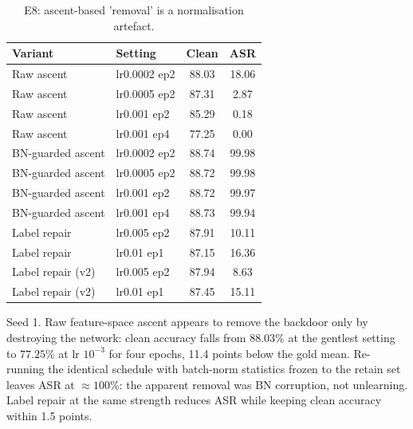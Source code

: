 \begin{table}[t]
\centering
\caption{E8: ascent-based 'removal' is a normalisation artefact.}
\label{tab:e8}
\footnotesize
\begin{tabular}{llcc}
\toprule
\textbf{Variant} & \textbf{Setting} & \textbf{Clean} & \textbf{ASR} \\
\midrule
Raw ascent & lr0.0002 ep2 & 88.03 & 18.06 \\
Raw ascent & lr0.0005 ep2 & 87.31 & 2.87 \\
Raw ascent & lr0.001 ep2 & 85.29 & 0.18 \\
Raw ascent & lr0.001 ep4 & 77.25 & 0.00 \\
BN-guarded ascent & lr0.0002 ep2 & 88.74 & 99.98 \\
BN-guarded ascent & lr0.0005 ep2 & 88.72 & 99.98 \\
BN-guarded ascent & lr0.001 ep2 & 88.72 & 99.97 \\
BN-guarded ascent & lr0.001 ep4 & 88.73 & 99.94 \\
Label repair & lr0.005 ep2 & 87.91 & 10.11 \\
Label repair & lr0.01 ep1 & 87.15 & 16.36 \\
Label repair (v2) & lr0.005 ep2 & 87.94 & 8.63 \\
Label repair (v2) & lr0.01 ep1 & 87.45 & 15.11 \\
\bottomrule
\end{tabular}
\par\vspace{1pt}\footnotesize\raggedright Seed 1. Raw feature-space ascent appears to remove the backdoor only by destroying the network: clean accuracy falls from $88.03\%$ at the gentlest setting to $77.25\%$ at lr $10^{-3}$ for four epochs, 11.4 points below the gold mean. Re-running the identical schedule with batch-norm statistics frozen to the retain set leaves ASR at $\approx100\%$: the apparent removal was BN corruption, not unlearning. Label repair at the same strength reduces ASR while keeping clean accuracy within 1.5 points.
\end{table}
